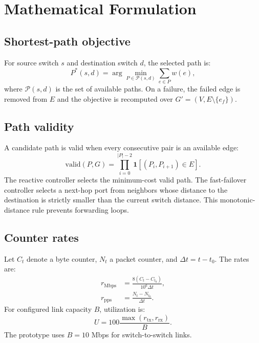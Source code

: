 \documentclass[conference]{IEEEtran}
\begin{document}
\section{Mathematical Formulation}
\label{sec:math}

\subsection{Shortest-path objective}

For source switch $s$ and destination switch $d$, the selected path is:
\begin{equation}
 P^{*}(s,d)=\arg\min_{P\in\mathcal{P}(s,d)}
 \sum_{e\in P}w(e),
\label{eq:shortest}
\end{equation}
where $\mathcal{P}(s,d)$ is the set of available paths. On a failure, the
failed edge is removed from $E$ and the objective is recomputed over
$G'=(V,E\setminus\{e_f\})$.

\subsection{Path validity}

A candidate path is valid when every consecutive pair is an available edge:
\begin{equation}
 \mathrm{valid}(P,G)=
 \prod_{i=0}^{|P|-2}\mathbf{1}
 \left[(P_i,P_{i+1})\in E\right].
\label{eq:valid}
\end{equation}
The reactive controller selects the minimum-cost valid path. The fast-failover
controller selects a next-hop port from neighbors whose distance to the
destination is strictly smaller than the current switch distance. This
monotonic-distance rule prevents forwarding loops.

\subsection{Counter rates}

Let $C_t$ denote a byte counter, $N_t$ a packet counter, and
$\Delta t=t-t_0$. The rates are:
\begin{align}
 r_{\mathrm{Mbps}} &= \frac{8(C_t-C_{t_0})}{10^6\Delta t},\\
 r_{\mathrm{pps}} &= \frac{N_t-N_{t_0}}{\Delta t}.
\label{eq:rates}
\end{align}
For configured link capacity $B$, utilization is:
\begin{equation}
 U=100\frac{\max(r_{\mathrm{tx}},r_{\mathrm{rx}})}{B}.
\label{eq:utilization}
\end{equation}
The prototype uses $B=10$ Mbps for switch-to-switch links.
\end{document}
